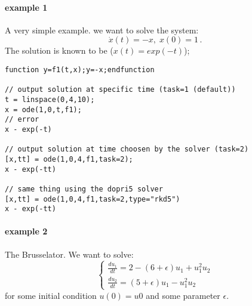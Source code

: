 \begin{examples}
  
\paragraph{example 1} A very simple example. we want to solve the system:
$$
  \dot{x}(t) = - x, \; x(0) = 1\,.
$$ 
The solution is known to be ($x(t) = exp(-t)$);
\begin{Verbatim}
function y=f1(t,x);y=-x;endfunction

// output solution at specific time (task=1 (default))
t = linspace(0,4,10);
x = ode(1,0,t,f1);
// error
x - exp(-t)

// output solution at time choosen by the solver (task=2)
[x,tt] = ode(1,0,4,f1,task=2);
x - exp(-tt)

// same thing using the dopri5 solver
[x,tt] = ode(1,0,4,f1,task=2,type="rkd5")
x - exp(-tt)
\end{Verbatim}
  
  
\paragraph{example 2} The Brusselator. We want to solve:
$$
\left\{
\begin{array}{l}
\frac{du_1}{dt} = 2 - (6 + \epsilon) u_1 + u_1^2 u_2 \\
\frac{du_2}{dt} = (5 + \epsilon) u_1 - u_1^2 u_2
\end{array}
\right.
$$
for some initial condition $u(0) = u0$ and some parameter $\epsilon$.
\begin{program}
\end{program}
  
  

\end{examples}
